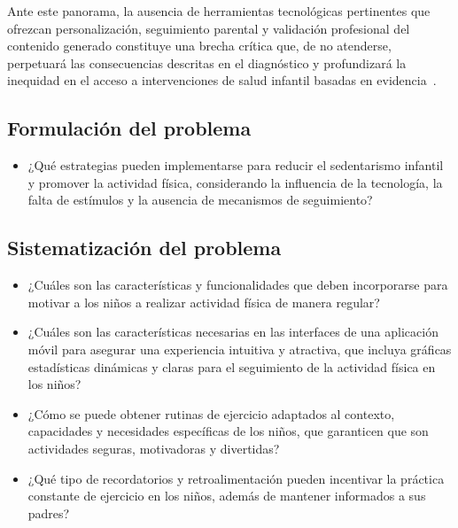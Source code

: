					Ante este panorama, la ausencia de herramientas tecnológicas pertinentes que ofrezcan personalización, seguimiento parental y validación profesional del contenido generado constituye una brecha crítica que, de no atenderse, perpetuará las consecuencias descritas en el diagnóstico y profundizará la inequidad en el acceso a intervenciones de salud infantil basadas en evidencia~\cite{Hesketh2017}.

			\subsection{Formulación del problema}
				
				\begin{itemize}
					\item ¿Qué estrategias pueden implementarse para reducir el sedentarismo infantil y promover la actividad física, considerando la influencia de la tecnología, la falta de estímulos y la ausencia de mecanismos de seguimiento?
				\end{itemize}

			\subsection{Sistematización del problema}

				\begin{itemize}
					\item ¿Cuáles son las características y funcionalidades que deben incorporarse para motivar a los niños a realizar actividad física de manera regular?
					\item ¿Cuáles son las características necesarias en las interfaces de una aplicación móvil para asegurar una experiencia intuitiva y atractiva, que incluya gráficas estadísticas dinámicas y claras para el seguimiento de la actividad física en los niños?
					\item ¿Cómo se puede obtener rutinas de ejercicio adaptados al contexto, capacidades y necesidades específicas de los niños, que garanticen que son actividades seguras, motivadoras y divertidas?
					\item ¿Qué tipo de recordatorios y retroalimentación pueden incentivar la práctica constante de ejercicio en los niños, además de mantener informados a sus padres?
				\end{itemize}
				
